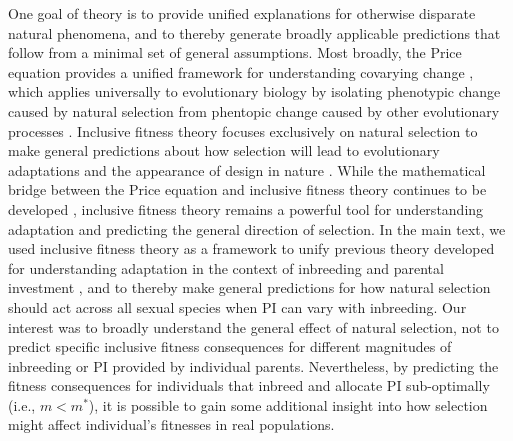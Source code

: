 \documentclass[12pt]{article}
\begin{document}
\noindent One goal of theory is to provide unified explanations for otherwise disparate natural phenomena, and to thereby generate broadly applicable predictions that follow from a minimal set of general assumptions. Most broadly, the Price equation provides a unified framework for understanding covarying change \cite[][]{Price1970}, which applies universally to evolutionary biology by isolating phenotypic change caused by natural selection from phentopic change caused by other evolutionary processes \cite[][]{Gardner2008}. Inclusive fitness theory focuses exclusively on natural selection to make general predictions about how selection will lead to evolutionary adaptations and the appearance of design in nature \cite[][]{Gardner2014}. While the mathematical bridge between the Price equation and inclusive fitness theory continues to be developed \cite[][]{Grafen2006, Grafen2014b}, inclusive fitness theory remains a powerful tool for understanding adaptation and predicting the general direction of selection. In the main text, we used inclusive fitness theory as a framework to unify previous theory developed for understanding adaptation in the context of inbreeding \cite[][]{Parker1979, Parker2006} and parental investment \cite[e.g.,][]{Macnair1978, Parker1978}, and to thereby make general predictions for how natural selection should act across all sexual species when PI can vary with inbreeding. Our interest was to broadly understand the general effect of natural selection, not to predict specific inclusive fitness consequences for different magnitudes of inbreeding or PI provided by individual parents. Nevertheless, by predicting the fitness consequences for individuals that inbreed and allocate PI sub-optimally (i.e., $m < m^{*}$), it is possible to gain some additional insight into how selection might affect individual's fitnesses in real populations. 
\end{document}

